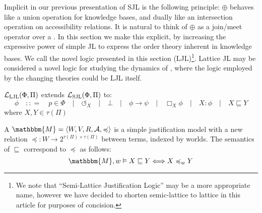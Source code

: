 Implicit in our previous presentation of SJL is the following
principle: 
 $\oplus$ behaves like a union
operation for knowledge bases, and dually like an intersection operation on
accessibility relations.  It is natural to think of $\oplus$ as a join/meet
operator over a {}.  In this section we make this
explicit, by increasing the expressive power of simple JL to express the order
theory inherent in knowledge bases.  We call the novel logic presented in
this section  (LJL){\footnote{We note
that ``Semi-Lattice Justification Logic'' may be a more appropriate name,
however we have decided to shorten semic-lattice to lattice in this article
for purposes of concision.}}.  Lattice JL may be considered a novel logic for
studying the dynamics of , where the logic employed by
the changing theories could be LJL itself.



\begin{definition}
  $\mathcal{L}_{\operatorname{LJL}} (\Phi, \Pi)$ extends $\mathcal{L}_{\operatorname{SJL}}
  (\Phi, \Pi)$ to:
  \[ \phi \hspace{1em} : : = \hspace{1em} p \in \Phi \hspace{1em} |
     \hspace{1em} \circlearrowleft_X \hspace{1em} | \hspace{1em} \bot
     \hspace{1em} | \hspace{1em} \phi \rightarrow \psi \hspace{1em} |
     \hspace{1em} \Box_X \phi \hspace{1em} | \hspace{1em} X : \phi
     \hspace{1em} | \hspace{1em} X \sqsubseteq Y \]
  where $X, Y \in \tau (\Pi)$
\end{definition}

\begin{definition}
  \label{justmodels}A {} $\mathbbm{M}=
  \langle W, V, R, \mathcal{A}, \preccurlyeq \rangle$ is a simple
  justification model with a new relation $\preccurlyeq : W \rightarrow
  2^{\tau (\Pi) \times \tau (\Pi)}$ between terms, indexed by worlds.  The
  semantics of $\sqsubseteq$ correspond to $\preccurlyeq$ as follows:
  \[ \mathbbm{M}, w \vDash X \sqsubseteq Y \Longleftrightarrow X
     \preccurlyeq_w Y \]
\end{definition}

